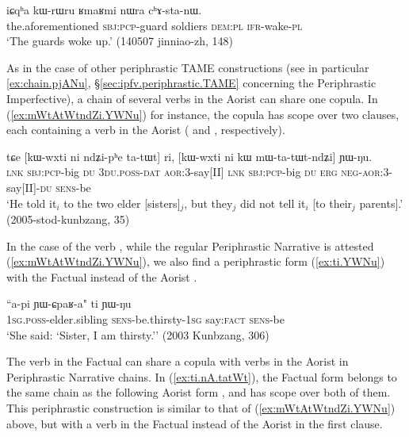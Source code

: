 \begin{exe}
\ex \label{ex:chAstanW}
\gll iɕqʰa kɯ-rɯru ʁmaʁmi nɯra cʰɤ-sta-nɯ. \\
the.aforementioned \textsc{sbj}:\textsc{pcp}-guard soldiers \textsc{dem}:\textsc{pl} \textsc{ifr}-wake-\textsc{pl} \\
\glt `The guards woke up.' (140507 jinniao-zh, 148)
\end{exe}

As in the case of other periphrastic TAME constructions (see in particular \ref{ex:chain.pjANu}, §\ref{sec:ipfv.periphrastic.TAME} concerning the Periphrastic Imperfective), a chain of several verbs in the Aorist can share one copula. In (\ref{ex:mWtAtWtndZi.YWNu}) for instance, the copula  has scope over two clauses, each containing a verb in the Aorist ( and , respectively).

\begin{exe}
\ex \label{ex:mWtAtWtndZi.YWNu}
\gll tɕe [kɯ-wxti ni ndʑi-pʰe ta-tɯt] ri, [kɯ-wxti ni kɯ mɯ-ta-tɯt-ndʑi] ɲɯ-ŋu. \\
\textsc{lnk} \textsc{sbj}:\textsc{pcp}-big \textsc{du} \textsc{3du}.\textsc{poss}-\textsc{dat} \textsc{aor}:3\flobv{}-say[II] \textsc{lnk} \textsc{sbj}:\textsc{pcp}-big \textsc{du} \textsc{erg} \textsc{neg}-\textsc{aor}:3\flobv{}-say[II]-\textsc{du} \textsc{sens}-be \\
\glt `He told it$_i$ to the two elder [sisters]$_j$, but they$_j$ did not tell it$_i$ [to their$_j$ parents].' (2005-stod-kunbzang, 35)
\end{exe}

In the case of the verb , while the regular Periphrastic Narrative is attested (\ref{ex:mWtAtWtndZi.YWNu}), we also find a periphrastic form  (\ref{ex:ti.YWNu}) with the Factual  instead of the Aorist .

\begin{exe}
\ex \label{ex:ti.YWNu}
\gll ``a-pi ɲɯ-ɕpaʁ-a" ti ɲɯ-ŋu \\
\textsc{1sg}.\textsc{poss}-elder.sibling \textsc{sens}-be.thirsty-\textsc{1sg} say:\textsc{fact} \textsc{sens}-be \\
\glt `She said: `Sister, I am thirsty.'' (2003 Kunbzang, 306)
\end{exe}

The verb  in the Factual can share a copula with verbs in the Aorist in Periphrastic Narrative chains. In (\ref{ex:ti.nA.tatWt}), the Factual form  belongs to the same chain as the following Aorist form , and  has scope over both of them. This periphrastic construction is similar to that of (\ref{ex:mWtAtWtndZi.YWNu}) above, but with a verb in the Factual instead of the Aorist in the first clause.


